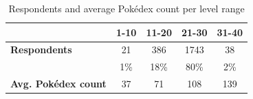 \begin{table}[h]
	\centering
	\caption{Respondents and average Pokédex count per level range}
	\label{tbl:survey-level-distribution}
	\begin{tabular}{|l||c|c|c|c|}
		\hline
		& \textbf{1-10} & \textbf{11-20} & \textbf{21-30} & \textbf{31-40}\\
		\hline\hline
		\textbf{Respondents}	& 21	& 386	& 1743	& 38\\
								& 1\%	& 18\%	& 80\%	& 2\%\\\hline
		\textbf{Avg. Pokédex count} & 37 & 71 & 108 & 139\\\hline
	\end{tabular}
\end{table}
